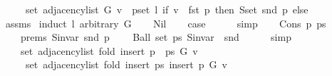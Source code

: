 \begin{isabellebody}
\ \ \ \ \ set\ {\isacharparenleft}{\kern0pt}adjacency{\isacharunderscore}{\kern0pt}list\ G\ v{\isacharparenright}{\kern0pt}\ {\isasymunion}\ {\isacharparenleft}{\kern0pt}{\isasymUnion}p{\isasymin}set\ l{\isachardot}{\kern0pt}\ if\ v\ {\isacharequal}{\kern0pt}\ fst\ p\ then\ S{\isachardot}{\kern0pt}set\ {\isacharparenleft}{\kern0pt}snd\ p{\isacharparenright}{\kern0pt}\ else\ {\isacharbraceleft}{\kern0pt}{\isacharbraceright}{\kern0pt}{\isacharparenright}{\kern0pt}{\isachardoublequoteclose}\isanewline
%
\isadelimproof
\ \ %
\endisadelimproof
%
\isatagproof
{}\isamarkupfalse%
\ assms\isanewline
{}\isamarkupfalse%
\ {\isacharparenleft}{\kern0pt}induct\ l\ arbitrary{\isacharcolon}{\kern0pt}\ G{\isacharparenright}{\kern0pt}\isanewline
\ \ \isamarkupfalse%
\ Nil\isanewline
\ \ \isamarkupfalse%
\ {\isacharquery}{\kern0pt}case\isanewline
\ \ \ \ \isamarkupfalse%
\ simp\isanewline
{}\isamarkupfalse%
\isanewline
\ \ \isamarkupfalse%
\ {\isacharparenleft}{\kern0pt}Cons\ p\ ps{\isacharparenright}{\kern0pt}\isanewline
\ \ \isamarkupfalse%
\isanewline
\ \ \ \ prems{\isacharcolon}{\kern0pt}\ {\isachardoublequoteopen}S{\isachardot}{\kern0pt}invar\ {\isacharparenleft}{\kern0pt}snd\ p{\isacharparenright}{\kern0pt}{\isachardoublequoteclose}\isanewline
\ \ \ \ {\isachardoublequoteopen}Ball\ {\isacharparenleft}{\kern0pt}set\ ps{\isacharparenright}{\kern0pt}\ {\isacharparenleft}{\kern0pt}S{\isachardot}{\kern0pt}invar\ {\isasymcirc}\ snd{\isacharparenright}{\kern0pt}{\isachardoublequoteclose}\isanewline
\ \ \ \ \isamarkupfalse%
\ simp{\isacharplus}{\kern0pt}\isanewline
\isanewline
\ \ \isamarkupfalse%
\isanewline
\ \ \ \ {\isachardoublequoteopen}set\ {\isacharparenleft}{\kern0pt}adjacency{\isacharunderscore}{\kern0pt}list\ {\isacharparenleft}{\kern0pt}fold\ insert{\isacharunderscore}{\kern0pt}{}\ {\isacharparenleft}{\kern0pt}p\ {\isacharhash}{\kern0pt}\ ps{\isacharparenright}{\kern0pt}\ G{\isacharparenright}{\kern0pt}\ v{\isacharparenright}{\kern0pt}\ {\isacharequal}{\kern0pt}\isanewline
\ \ \ \ \ set\ {\isacharparenleft}{\kern0pt}adjacency{\isacharunderscore}{\kern0pt}list\ {\isacharparenleft}{\kern0pt}fold\ insert{\isacharunderscore}{\kern0pt}{}\ ps\ {\isacharparenleft}{\kern0pt}insert{\isacharunderscore}{\kern0pt}{}\ p\ G{\isacharparenright}{\kern0pt}{\isacharparenright}{\kern0pt}\ v{\isacharparenright}{\kern0pt}{\isachardoublequoteclose}\isanewline
\ \ \ \ \isamarkupfalse%

\end{isabellebody}
